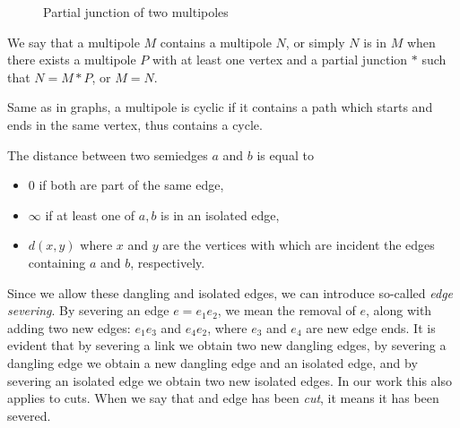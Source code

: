 \documentclass[12pt, twoside]{book}
\begin{document}
\begin{figure}
	\caption{Partial junction of two multipoles}
	\label{fig:partial-junction-of-two-multipoles}
\end{figure}

We say that a multipole $M$ contains a multipole $N$, or simply $N$ is in $M$ when there exists a multipole $P$ with at least one vertex and a partial junction $*$ such that $N=M*P$, or $M=N$.

Same as in graphs, a multipole is cyclic if it contains a path which starts and ends in the same vertex, thus contains a cycle.

The distance between two semiedges $a$ and $b$ is equal to
\begin{itemize}
	\item 0 if both are part of the same edge,
	\item $\infty$ if at least one of $a,b$ is in an isolated edge,
	\item $d(x,y)$ where $x$ and $y$ are the vertices with which are incident the edges containing $a$ and $b$, respectively.
\end{itemize}

Since we allow these dangling and isolated edges, we can introduce so-called \textit{edge severing}. By severing an edge $e=e_1e_2$, we mean the removal of $e$, along with adding two new edges: $e_1e_3$ and $e_4e_2$, where $e_3$ and $e_4$ are new edge ends. It is evident that by severing a link we obtain two new dangling edges, by severing a dangling edge we obtain a new dangling edge and an isolated edge, and by severing an isolated edge we obtain two new isolated edges. In our work this also applies to cuts. When we say that and edge has been \textit{cut}, it means it has been severed.
\end{document}
